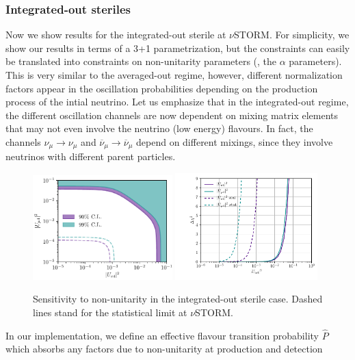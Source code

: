 \subsubsection{Integrated-out steriles}

Now we show results for the integrated-out sterile at $\nu$STORM. For simplicity, we show our results in terms of a 3+1 parametrization, but the constraints can easily be translated into constraints on non-unitarity parameters (\eg, the $\alpha$ parameters). This is very similar to the averaged-out regime, however, different normalization factors appear in the oscillation probabilities depending on the production process of the intial neutrino. Let us emphasize that in the integrated-out regime, the different oscillation channels are now dependent on mixing matrix elements that may not even involve the neutrino (low energy) flavours. In fact, the channels $\nu_{\mu} \to \nu_{\mu}$ and $\overline{\nu}_{\mu} \to \overline{\nu}_{\mu}$ depend on different mixings, since they involve neutrinos with different parent particles.
%
\begin{figure}
\includegraphics[width=0.48\textwidth]{figs/MUV_joined.pdf}
\includegraphics[width=0.49\textwidth]{figs/MUV_1D.pdf}
\caption[Sensitivity to non-unitarity in the integrated-out sterile case.]{Sensitivity to non-unitarity in the integrated-out sterile case. Dashed lines stand for the statistical limit at $\nu$STORM. \label{fig:non-uni_MUV}}
\end{figure}
%
In our implementation, we define an effective flavour transition probability $\hat{P}$ which absorbs any factors due to non-unitarity at production and detection
